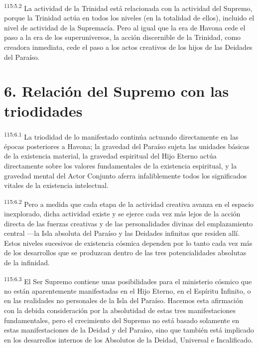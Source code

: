 \documentclass[twoside, 11pt]{book}
\begin{document}
\par
\textsuperscript{115:5.2} La actividad de la Trinidad está relacionada con la actividad del Supremo, porque la Trinidad actúa en todos los niveles (en la totalidad de ellos), incluido el nivel de actividad de la Supremacía. Pero al igual que la era de Havona cede el paso a la era de los superuniversos, la acción discernible de la Trinidad, como creadora inmediata, cede el paso a los actos creativos de los hijos de las Deidades del Paraíso.

\section*{6. Relación del Supremo con las triodidades}
\par
\textsuperscript{115:6.1} La triodidad de lo manifestado continúa actuando directamente en las épocas posteriores a Havona; la gravedad del Paraíso sujeta las unidades básicas de la existencia material, la gravedad espiritual del Hijo Eterno actúa directamente sobre los valores fundamentales de la existencia espiritual, y la gravedad mental del Actor Conjunto aferra infaliblemente todos los significados vitales de la existencia intelectual.

\par
\textsuperscript{115:6.2} Pero a medida que cada etapa de la actividad creativa avanza en el espacio inexplorado, dicha actividad existe y se ejerce cada vez más lejos de la acción directa de las fuerzas creativas y de las personalidades divinas del emplazamiento central ---la Isla absoluta del Paraíso y las Deidades infinitas que residen allí. Estos niveles sucesivos de existencia cósmica dependen por lo tanto cada vez más de los desarrollos que se produzcan dentro de las tres potencialidades absolutas de la infinidad.

\par
\textsuperscript{115:6.3} El Ser Supremo contiene unas posibilidades para el ministerio cósmico que no están aparentemente manifestadas en el Hijo Eterno, en el Espíritu Infinito, o en las realidades no personales de la Isla del Paraíso. Hacemos esta afirmación con la debida consideración por la absolutidad de estas tres manifestaciones fundamentales, pero el crecimiento del Supremo no está basado solamente en estas manifestaciones de la Deidad y del Paraíso, sino que también está implicado en los desarrollos internos de los Absolutos de la Deidad, Universal e Incalificado.
\end{document}
